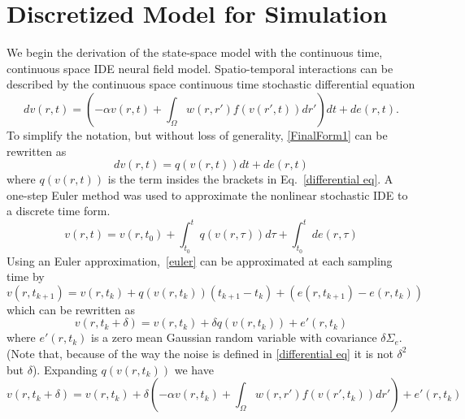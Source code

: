 \documentclass[onecolumn,draftcls]{IEEEtran}
\begin{document}
\section{Discretized Model for Simulation}
We begin the derivation of the state-space model with the continuous time, continuous space IDE neural field model. 
Spatio-temporal interactions can be described by the continuous space continuous time stochastic differential equation
\begin{equation}\label{differential eq}	
dv\left( r,t \right) =  \left( -\alpha v\left( r,t \right) + \int_\Omega  {w\left( r,r' \right)f\left( {v\left( r',t \right)} \right)dr'} \right) dt  + d e\left( r,t \right).
\end{equation}
To simplify the notation, but without loss of generality, \ref{FinalForm1} can be rewritten as
\begin{equation}\label{differential simplified}
	dv\left( r,t \right) = q\left(v\left(r,t\right) \right) dt  + d e\left( r,t \right)
\end{equation}
where $q\left(v\left(r,t\right)\right)$ is the term insides the brackets in Eq.~\ref{differential eq}. A one-step Euler method was used to approximate the nonlinear stochastic IDE to a discrete time form. 
\begin{equation}\label{euler}
	v\left(r,t\right) =  v(r,t_0) + \int_{t_0}^{t} q\left(v(r,\tau) \right) d\tau  + \int_{t_0}^{t} d e\left(r,\tau\right)
\end{equation}
Using an Euler approximation,~\ref{euler} can be approximated at each sampling time by
\begin{equation}\label{euler approx 1}
	v\left(r,t_{k+1} \right) =  v(r,t_k) + q\left(v(r,t_k)\right) (t_{k+1} - t_k) + (e(r,t_{k+1}) - e(r,t_k))
\end{equation}
which can be rewritten as
\begin{equation}\label{euler approx 2}
	v\left(r,t_k + \delta \right) =  v(r,t_k) + \delta q\left(v(r,t_k)\right) + e'(r,t_k)
\end{equation}
where $e'(r,t_k)$ is a zero mean Gaussian random variable with covariance $\delta\Sigma_e$. (Note that, because of the way the noise is defined in \ref{differential eq} it is not $\delta^2$ but $\delta$). Expanding $q\left(v(r,t_k)\right)$ we have
\begin{equation}\label{discrete time model}
	v\left(r,t_k + \delta \right) =  v(r,t_k) + \delta  \left( -\alpha v\left( r,t_k \right) + \int_\Omega  {w\left( r,r' \right)f\left( {v\left( r',t_k \right)} \right)dr'} \right) + e'(r,t_k)
\end{equation}
\end{document}
